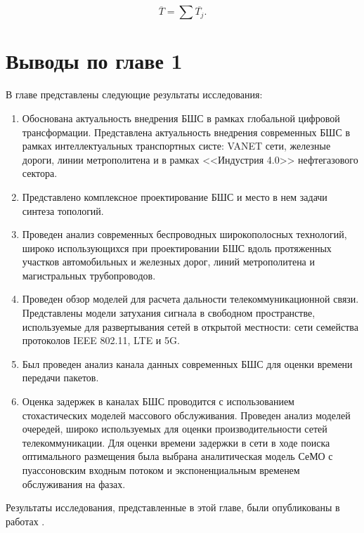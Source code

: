 \begin{equation}
    \label{eq:end_to_end_delay}
    \overline{T}= \sum{\overline{T_j}}.
\end{equation}

\section{Выводы по главе 1}
 
В главе представлены следующие результаты исследования:

\begin{enumerate}
  \item Обоснована актуальность внедрения БШС в рамках глобальной цифровой трансформации. Представлена актуальность внедрения современных БШС в рамках интеллектуальных транспортных систе: VANET сети, железные дороги, линии метрополитена и в рамках <<Индустрия 4.0>> нефтегазового сектора.
  \item Представлено комплексное проектирование БШС и место в нем задачи синтеза топологий. 
  \item Проведен анализ современных беспроводных широкополосных технологий, широко использующихся при проектировании БШС вдоль протяженных участков автомобильных и железных дорог, линий метрополитена и магистральных трубопроводов.
  \item Проведен обзор моделей для расчета дальности телекоммуникационной связи. Представлены модели затухания сигнала в свободном пространстве, используемые для развертывания сетей в открытой местности: сети семейства протоколов IEEE 802.11, LTE и 5G.
  \item Был проведен анализ канала данных современных БШС для оценки времени передачи пакетов.
  \item Оценка задержек в каналах БШС проводится с использованием стохастических моделей массового обслуживания. Проведен анализ моделей очередей, широко используемых для оценки производительности сетей телекоммуникации. Для оценки времени задержки в сети в ходе поиска оптимального размещения была выбрана аналитическая модель СеМО с пуассоновским входным потоком и экспоненциальным временем обслуживания на фазах.
\end{enumerate}

Результаты исследования, представленные в этой главе, были опубликованы в работах \cite{Larionov2021, LazarevaLarionovMukhtarovITTMM2020_RSCI, VishnevskyLarionovMukhtarovICAM2020_RSCI, }.











\FloatBarrier
